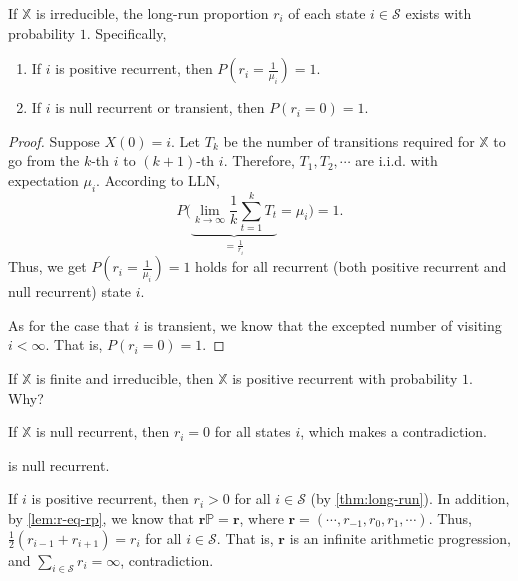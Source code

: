 \begin{theorem} \label{thm:long-run}
If $ \mathbb{X} $ is irreducible, the long-run proportion $ r_{i} $ of each state $ i \in \mathcal{S} $ exists with probability $ 1 $. Specifically,
\begin{enumerate}
  \item If $ i $ is positive recurrent, then $ P \left( r_{i} = \frac{1}{\mu_{i}} \right) = 1 $.
  \item If $ i $ is null recurrent or transient, then $ P(r_{i} = 0) = 1 $.
\end{enumerate}

\begin{proof}
Suppose $ X(0) = i $. Let $ T_{k} $ be the number of transitions required for $ \mathbb{X} $ to go from the $ k $-th $ i $ to $ (k + 1) $-th $ i $. Therefore, $ T_{1}, T_{2}, \cdots $ are i.i.d. with expectation $ \mu_{i} $. According to LLN,
\[ P \Bigg( \underbrace{\lim_{k \to \infty} \frac{1}{k} \sum_{t = 1}^{k} T_{t}}_{= \frac{1}{r_{i}}} = \mu_{i} \Bigg) = 1. \]
Thus, we get $ P \left( r_{i} = \frac{1}{\mu_{i}} \right) = 1 $ holds for all recurrent (both positive recurrent and null recurrent) state $ i $.

As for the case that $ i $ is transient, we know that the excepted number of visiting $ i < \infty $. That is, $ P(r_{i} = 0) = 1 $.
\end{proof}
\end{theorem}

\begin{example}
If $ \mathbb{X} $ is finite and irreducible, then $ \mathbb{X} $ is positive recurrent with probability $ 1 $. Why?

If $ \mathbb{X} $ is null recurrent, then $ r_{i} = 0 $ for all states $ i $, which makes a contradiction.
\end{example}

\begin{example}
 is null recurrent.

If $ i $ is positive recurrent, then $ r_{i} > 0 $ for all $ i \in \mathcal{S} $ (by \autoref{thm:long-run}).
In addition, by \autoref{lem:r-eq-rp}, we know that $ \mathbf{r}\mathbb{P} = \mathbf{r} $, where $ \mathbf{r} = (\cdots, r_{-1}, r_{0}, r_{1}, \cdots) $. Thus, $ \frac{1}{2} (r_{i - 1} + r_{i + 1}) = r_{i} $ for all $ i \in \mathcal{S} $. That is, $ \mathbf{r} $ is an infinite arithmetic progression, and $ \sum_{i \in \mathcal{S}} r_{i} = \infty $, contradiction.
\end{example}

